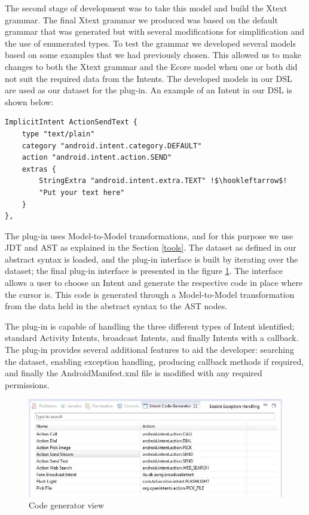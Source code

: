 The second stage of development was to take this model and build the Xtext grammar. The final Xtext grammar we produced was based on the default grammar that was generated but with several modifications for simplification and the use of enumerated types. To test the grammar we developed several models based on some examples that we had previously chosen. This allowed us to make changes to both the Xtext grammar and the Ecore model when one or both did not suit the required data from the Intents. The developed models in our DSL are used as our dataset for the plug-in. An example of an Intent in our DSL is shown below:

{\footnotesize\begin{lstlisting}[escapechar=!]
ImplicitIntent ActionSendText {
	type "text/plain"
	category "android.intent.category.DEFAULT"
	action "android.intent.action.SEND"
	extras {
		StringExtra "android.intent.extra.TEXT" !$\hookleftarrow$!
		"Put your text here"
	}
},
\end{lstlisting}}

The plug-in uses Model-to-Model transformations, and for this purpose we use JDT and AST as explained in the Section \ref{tools}. The dataset as defined in our abstract syntax is loaded, and the plug-in interface is built by iterating over the dataset; the final plug-in interface is presented in the figure \ref{codegeneratorview}. The interface allows a user to choose an Intent and generate the respective code in place where the cursor is. This code is generated through a Model-to-Model transformation from the data held in the abstract syntax to the AST nodes.

The plug-in is capable of handling the three different types of Intent identified; standard Activity Intents, broadcast Intents, and finally Intents with a callback. The plug-in provides several additional features to aid the developer: searching the dataset, enabling exception handling, producing callback methods if required, and finally the AndroidManifest.xml file is modified with any required permissions.


\begin{figure}[H]
\label{codegeneratorview}
  \centering
    \includegraphics[width=\textwidth]{codegenerator}
  \caption{Code generator view}
\end{figure}

